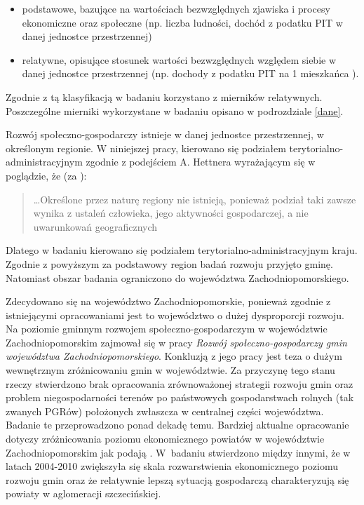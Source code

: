 \documentclass{amuthesis}
\begin{document}
\begin{itemize}
\tightlist
\item
  podstawowe, bazujące na wartościach bezwzględnych zjawiska i procesy ekonomiczne oraz społeczne (np. liczba ludności, dochód z podatku PIT w danej jednostce przestrzennej)
\item
  relatywne, opisujące stosunek wartości bezwzględnych względem siebie w danej jednostce przestrzennej (np. dochody z podatku PIT na 1 mieszkańca ).
\end{itemize}

Zgodnie z tą klasyfikacją w badaniu korzystano z mierników relatywnych. Poszczególne mierniki wykorzystane w badaniu opisano w podrozdziale \ref{dane}.

Rozwój społeczno-gospodarczy istnieje w danej jednostce przestrzennej, w określonym regionie.
W niniejszej pracy, kierowano się podziałem terytorialno-administracyjnym zgodnie z podejściem A. Hettnera wyrażającym się w poglądzie, że (za \textcite{pajak}):

\begin{quote}
\ldots Określone przez naturę regiony nie istnieją, ponieważ podział taki zawsze wynika z ustaleń człowieka, jego aktywności gospodarczej, a nie uwarunkowań geograficznych
\end{quote}

Dlatego w badaniu kierowano się podziałem terytorialno-administracyjnym kraju.
Zgodnie z powyższym za podstawowy region badań rozwoju przyjęto gminę.
Natomiast obszar badania ograniczono do województwa Zachodniopomorskiego.

Zdecydowano się na województwo Zachodniopomorskie, ponieważ zgodnie z istniejącymi opracowaniami jest to województwo o dużej dysproporcji rozwoju.
Na poziomie gminnym rozwojem społeczno-gospodarczym w województwie Zachodniopomorskim zajmował się \textcite{czyzycki} w pracy \emph{Rozwój społeczno-gospodarczy gmin województwa Zachodniopomorskiego}.
Konkluzją z jego pracy jest teza o dużym wewnętrznym zróżnicowaniu gmin w województwie.
Za przyczynę tego stanu rzeczy stwierdzono brak opracowania zrównoważonej strategii rozwoju gmin oraz problem niegospodarności terenów po państwowych gospodarstwach rolnych (tak zwanych PGRów) położonych zwłaszcza w centralnej części województwa.
Badanie te przeprowadzono ponad dekadę temu.
Bardziej aktualne opracowanie dotyczy zróżnicowania poziomu ekonomicznego powiatów w województwie Zachodniopomorskim jak podają \textcite{adamczyk}.
W~badaniu stwierdzono między innymi, że w latach 2004-2010 zwiększyła się skala rozwarstwienia ekonomicznego poziomu rozwoju gmin oraz że relatywnie lepszą sytuacją gospodarczą charakteryzują się powiaty w aglomeracji szczecińskiej.
\end{document}
